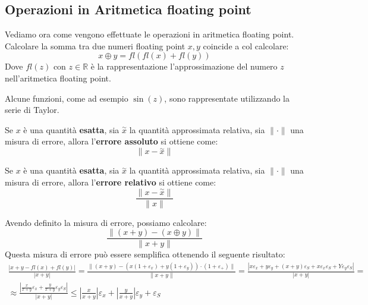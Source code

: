 \subsection{Operazioni in Aritmetica floating point}
Vediamo ora come vengono effettuate le operazioni in aritmetica floating point.
Calcolare la somma tra due numeri floating point $x,y$ coincide a col calcolare:
\begin{equation}
    x \oplus y = fl(fl(x) + fl(y))
\end{equation}
Dove $fl(z)$ con $z\in \mathbb{R}$ è la rappresentazione l'approssimazione del
numero $z$ nell'aritmetica floating point.
\begin{nota}
    Alcune funzioni, come ad esempio $\sin(z)$, sono rappresentate utilizzando
    la serie di Taylor.
\end{nota}
\begin{definizione} 
    Se $x$ è una quantità \textbf{esatta}, sia $\stackrel{\sim}{x}$ la quantità
    approssimata relativa, sia $\|\cdot\|$ una misura di errore, allora
    l'\textbf{errore assoluto} si ottiene come:
    \begin{equation}
        \|x-\stackrel{\sim}{x}\|
    \end{equation}
\end{definizione}
\begin{definizione} 
    Se $x$ è una quantità \textbf{esatta}, sia $\stackrel{\sim}{x}$ la quantità
    approssimata relativa, sia $\|\cdot\|$ una misura di errore, allora
    l'\textbf{errore relativo} si ottiene come:
    \begin{equation}
        \frac{\|x-\stackrel{\sim}{x}\|}{\|x\|}
    \end{equation}
\end{definizione}
Avendo definito la misura di errore, possiamo calcolare:
\begin{equation}
    \frac{\|(x+y)-(x\oplus y)\|}{\|x+y\|}
\end{equation}
Questa misura di errore può essere semplifica ottenendo il seguente risultato:
\begin{equation}
    \begin{aligned}
        \frac{|x + y - fl(x) + fl(y)|}{|x + y|} = \frac{\|(x + y) - (x (1 + 
        \varepsilon_x) + y(1 + \varepsilon_y)) \cdot (1 + \varepsilon_+)\|}{\|x + y\|} =
        \frac{|x \varepsilon_x + y \varepsilon_y + (x + y) \varepsilon_S + x 
        \varepsilon_x \varepsilon_S + Y \varepsilon_y \varepsilon_S|}{|x + y|} = \\
        \approx \frac{\left|\frac{x}{x + y} \varepsilon_x + \frac{y}{x + y} 
        \varepsilon_y \varepsilon_S \right|}{|x + y|} \leq \left|\frac{x}{x + y}
        \right| \varepsilon_x + \left|\frac{y}{x + y}\right| \varepsilon_y + \varepsilon_S
    \end{aligned}
\end{equation}
